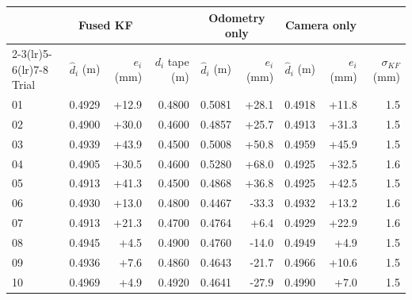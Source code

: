 \begin{tabular}{@{}lrrrrrrrr@{}}\toprule
& \multicolumn{2}{c}{Fused KF} & & \multicolumn{2}{c}{Odometry only} & \multicolumn{2}{c}{Camera only} & \\
\cmidrule(lr){2-3}\cmidrule(lr){5-6}\cmidrule(lr){7-8}
Trial & $\hat d_i$ (m) & $e_i$ (mm) & $d_i$ tape (m) & $\hat d_i$ (m) & $e_i$ (mm) & $\hat d_i$ (m) & $e_i$ (mm) & $\sigma_{KF}$ (mm)\\\midrule
01 & 0.4929 & +12.9 & 0.4800 & 0.5081 & +28.1 & 0.4918 & +11.8 & 1.5\\
02 & 0.4900 & +30.0 & 0.4600 & 0.4857 & +25.7 & 0.4913 & +31.3 & 1.5\\
03 & 0.4939 & +43.9 & 0.4500 & 0.5008 & +50.8 & 0.4959 & +45.9 & 1.5\\
04 & 0.4905 & +30.5 & 0.4600 & 0.5280 & +68.0 & 0.4925 & +32.5 & 1.6\\
05 & 0.4913 & +41.3 & 0.4500 & 0.4868 & +36.8 & 0.4925 & +42.5 & 1.5\\
06 & 0.4930 & +13.0 & 0.4800 & 0.4467 & -33.3 & 0.4932 & +13.2 & 1.6\\
07 & 0.4913 & +21.3 & 0.4700 & 0.4764 & +6.4 & 0.4929 & +22.9 & 1.6\\
08 & 0.4945 & +4.5 & 0.4900 & 0.4760 & -14.0 & 0.4949 & +4.9 & 1.5\\
09 & 0.4936 & +7.6 & 0.4860 & 0.4643 & -21.7 & 0.4966 & +10.6 & 1.5\\
10 & 0.4969 & +4.9 & 0.4920 & 0.4641 & -27.9 & 0.4990 & +7.0 & 1.5\\
\bottomrule\end{tabular}
